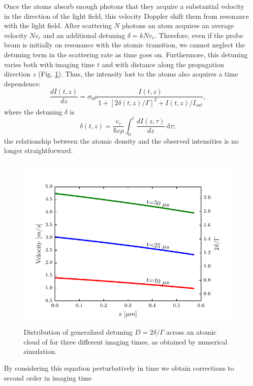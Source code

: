 \documentclass[12pt]{iopart}
\begin{document}
\par Once the atoms absorb enough photons that they acquire a substantial velocity in the direction of the light field, this velocity Doppler shift them from resonance with the light field. After scattering $N$ photons an atom acquires an average velocity $N v_r$ and an additional detuning $\delta=k N v_r$. Therefore, even if the probe beam is initially on resonance with the atomic transition, we cannot neglect the detuning term in the scattering rate as time goes on. Furthermore, this detuning varies both with imaging time $t$ and with distance along the propagation direction $z$ (Fig. \ref{fig:detunedBlobs}). Thus, the intensity lost to the atoms also acquires a time dependence: 
\begin{equation}
\frac{dI(t,z)}{dz}=\sigma_0 \rho \frac{I(t,z)}{1+[2\delta(t,z)/\Gamma]^2 +I(t,z)/I_{sat}}, \label{eq3}
\end{equation}
where the detuning $\delta$ is
\begin{equation}
\delta(t,z)=\frac{v_r}{\hbar c \rho}\int_0^t \frac{dI(z,\tau)}{dz}\,\mathrm{d}\tau; \label{eq4} 
\end{equation}
the relationship between the atomic density and the observed intensities is no longer straightforward.
\begin{figure}
	\includegraphics*{Figure1.pdf}
\caption{Distribution of generalized detuning $D=2\delta/\Gamma$ across an atomic cloud of \K{} for three different imaging times, as obtained by numerical simulation.}  
\label{fig:detunedBlobs}
\end{figure}
\par By considering this equation perturbatively in time we obtain corrections to second order in imaging time \cite{LJLthesis}
\end{document}
